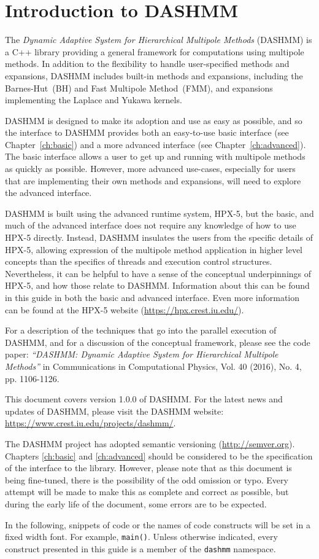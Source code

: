 \chapter{Introduction to DASHMM}
\label{ch:intro}

The {\it Dynamic Adaptive System for Hierarchical Multipole Methods}
(DASHMM) is a C++ library providing a general framework for
computations using multipole methods. In addition to the flexibility
to handle user-specified methods and expansions, DASHMM includes
built-in methods and expansions, including the Barnes-Hut~(BH) and
Fast Multipole Method~(FMM), and expansions implementing the Laplace
and Yukawa kernels.

DASHMM is designed to make its adoption and use as easy as possible,
and so the interface to DASHMM provides both an easy-to-use basic
interface (see Chapter~\ref{ch:basic}) and a more advanced interface
(see Chapter~\ref{ch:advanced}). The basic interface allows a
user to get up and running with multipole methods as quickly as
possible. However, more advanced use-cases, especially for users that
are implementing their own methods and expansions, will need to
explore the advanced interface.

DASHMM is built using the advanced runtime system, HPX-5, but the
basic, and much of the advanced interface does not require any
knowledge of how to use HPX-5 directly. Instead, DASHMM insulates the
users from the specific details of HPX-5, allowing expression of the
multipole method application in higher level concepts than the
specifics of threads and execution control structures. Nevertheless,
it can be helpful to have a sense of the conceptual underpinnings of
HPX-5, and how those relate to DASHMM. Information about this can be
found in this guide in both the basic and advanced interface. Even
more information can be found at the HPX-5 website
(\url{https://hpx.crest.iu.edu/}).

For a description of the techniques that go into the parallel
execution of DASHMM, and for a discussion of the conceptual framework,
please see the code paper: {\it ``DASHMM: Dynamic Adaptive System for
  Hierarchical Multipole Methods''} in Communications in Computational
Physics, Vol. 40 (2016), No. 4, pp. 1106-1126.

This document covers version 1.0.0 of DASHMM. For the latest news and
updates of DASHMM, please visit the DASHMM website:
\url{https://www.crest.iu.edu/projects/dashmm/}.

The DASHMM project has adopted semantic versioning (\url{http://semver.org}).
Chapters \ref{ch:basic} and \ref{ch:advanced} should be considered to be the
specification of the interface to the library. However, please note that as
this document is being fine-tuned, there is the possibility of the odd
omission or typo. Every attempt will be made to make this as complete and
correct as possible, but during the early life of the document, some errors
are to be expected.

In the following, snippets of code or the names of code constructs
will be set in a fixed width font. For example, {\tt main()}. Unless
otherwise indicated, every construct presented in this guide is a
member of the {\tt dashmm} namespace.